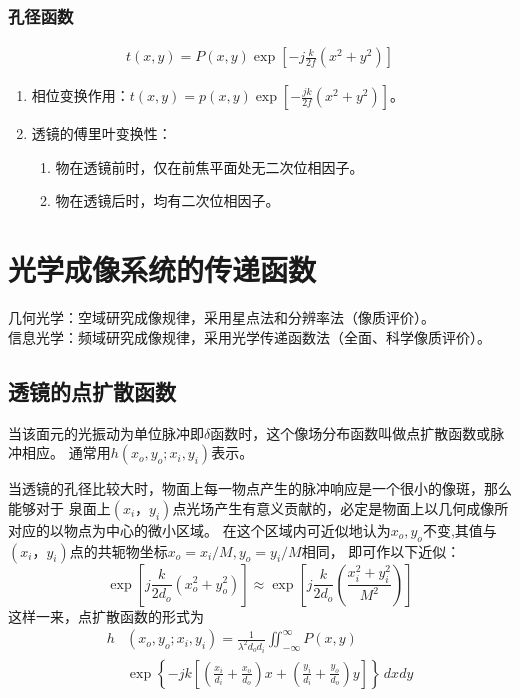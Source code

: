 \documentclass[twocolumn]{ctexart}
\begin{document}
\subsubsection{孔径函数}
\begin{equation}
    \begin{aligned}
        t\left(x,y\right)=P\left(x,y\right)\exp \left[-j\frac{k}{2f}\left(x^2+y^2\right)\right]
    \end{aligned}
    \nonumber
\end{equation}
\begin{enumerate}
    \item 相位变换作用：$t\left(x,y\right)=p\left(x,y\right)\exp \left[-\frac{jk}{2f}\left(x^2+y^2\right)\right]$。
    \item 透镜的傅里叶变换性：\begin{enumerate}
        \item 物在透镜前时，仅在前焦平面处无二次位相因子。
        \item 物在透镜后时，均有二次位相因子。
    \end{enumerate}
\end{enumerate}


\section{光学成像系统的传递函数}
几何光学：空域研究成像规律，采用星点法和分辨率法（像质评价）。\\
信息光学：频域研究成像规律，采用光学传递函数法（全面、科学像质评价）。
\subsection{透镜的点扩散函数}
当该面元的光振动为单位脉冲即$\delta$函数时，这个像场分布函数叫做点扩散函数或脉冲相应。
通常用$h\left(x_o,y_o;x_i,y_i\right)$表示。\par
当透镜的孔径比较大时，物面上每一物点产生的脉冲响应是一个很小的像斑，那么能够对于
泉面上$(x_i，y_i)$点光场产生有意义贡献的，必定是物面上以几何成像所对应的以物点为中心的微小区域。
在这个区域内可近似地认为$x_o,y_o$不变,其值与$(x_i，y_i)$点的共轭物坐标$x_o=x_i/M,y_o=y_i/M$相同，
即可作以下近似：\begin{equation}
    \exp\left[j\frac{k}{2d_o}\left(x_o^2+y_o^2\right) \right]\approx \exp \left[j\frac{k}{2d_o}\left(\frac{x_i^2+y_i^2}{M^2}\right)\right]
    \nonumber
\end{equation}
这样一来，点扩散函数的形式为\begin{equation}
    \begin{aligned}
        h&\left(x_o,y_o;x_i,y_i\right)=\frac{1}{\lambda ^2d_o d_i}\iint ^\infty _{-\infty} P\left(x,y\right)\\
        &\exp \left\{-jk\left[\left(\frac{x_i}{d_i}+\frac{x_o}{d_o}\right)x+\left(\frac{y_i}{d_i}+\frac{y_o}{d_o}\right)y\right]\right\}\,dxdy
    \end{aligned}
    \nonumber
\end{equation}
\end{document}
